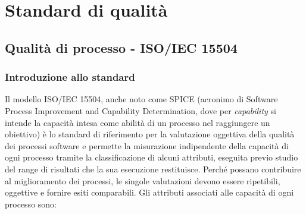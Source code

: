 \documentclass[openany,12pt,a4paper]{report}
\begin{document}

\chapter{Standard di qualità}


\section{Qualità di processo - ISO/IEC 15504}

\subsection{Introduzione allo standard}

Il modello ISO/IEC 15504, anche noto come SPICE (acronimo di Software Process Improvement and Capability Determination, dove per \textit{capability} si intende la capacità intesa come abilità di un processo nel raggiungere un obiettivo) è lo standard di riferimento per la valutazione oggettiva della qualità dei processi software e permette la misurazione indipendente della capacità di ogni processo tramite la classificazione di alcuni attributi, eseguita previo studio del range di risultati che la sua esecuzione restituisce. Perché possano contribuire al miglioramento dei processi, le singole valutazioni devono essere ripetibili, oggettive e fornire esiti comparabili. Gli attributi associati alle capacità di ogni processo sono:
\end{document}
